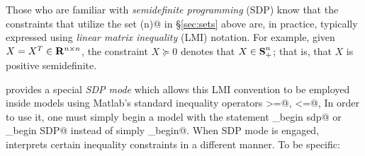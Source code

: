 \documentclass[12pt]{article}
\newcommand{\symm}{{\mbox{\bf S}}}  %
\begin{document}
Those who are familiar with \emph{semidefinite
programming} (SDP) know that the constraints that utilize
the set \verb@semidefinite(n)@ in \S\ref{sec:sets} above are, in practice, typically
expressed using \emph{linear matrix inequality} (LMI) notation. 
For example, given $X=X^T\in\mathbf{R}^{{n}\times{n}}$, the
constraint $X\succeq 0$ denotes that $X\in\symm^n_+$; that is, that
$X$ is positive semidefinite.

\cvx provides a special \emph{SDP mode} which allows this
LMI convention to be employed inside \cvx models
using Matlab's standard inequality operators \verb@>=@, \verb@<=@, \etc
In order to use it, one must simply begin a model with the statement
\verb@cvx_begin sdp@ or \verb@cvx_begin SDP@ instead of simply \verb@cvx_begin@. When SDP mode 
is engaged, \cvx interprets certain inequality constraints in a
different manner. To be specific:
\end{document}

